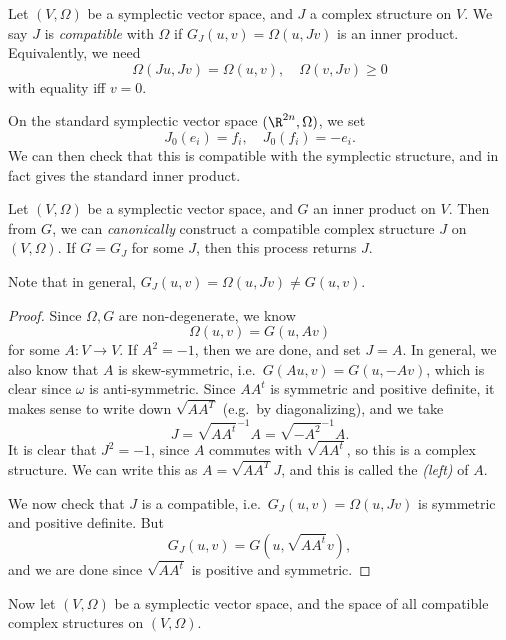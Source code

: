 \documentclass[a4paper]{article}
\begin{document}
\begin{defi}
  Let $(V, \Omega)$ be a symplectic vector space, and $J$ a complex structure on $V$. We say $J$ is \emph{compatible} with $\Omega$ if $G_J(u, v) = \Omega(u, Jv)$ is an inner product. Equivalently, we need
  \[
    \Omega(Ju, Jv) = \Omega(u, v),\quad \Omega(v, Jv) \geq 0
  \]
  with equality iff $v = 0$.
\end{defi}

\begin{eg}
  On the standard symplectic vector space $(\R^{2n}, \Omega)$, we set
  \[
    J_0(e_i) = f_i,\quad J_0(f_i) = - e_i.
  \]
  We can then check that this is compatible with the symplectic structure, and in fact gives the standard inner product.
\end{eg}

\begin{prop}
  Let $(V, \Omega)$ be a symplectic vector space, and $G$ an inner product on $V$. Then from $G$, we can \emph{canonically} construct a compatible complex structure $J$ on $(V, \Omega)$. If $G = G_{J}$ for some $J$, then this process returns $J$.
\end{prop}

Note that in general, $G_J(u, v) = \Omega(u, Jv) \not= G(u, v)$.
\begin{proof}
  Since $\Omega, G$ are non-degenerate, we know
  \[
    \Omega(u, v) = G(u, Av)
  \]
  for some $A: V \to V$. If $A^2 = -1$, then we are done, and set $J = A$. In general, we also know that $A$ is skew-symmetric, i.e.\ $G(Au, v) = G(u, -Av)$, which is clear since $\omega$ is anti-symmetric. Since $AA^t$ is symmetric and positive definite, it makes sense to write down $\sqrt{AA^T}$ (e.g.\ by diagonalizing), and we take
  \[
    J = \sqrt{AA^t}^{-1} A = \sqrt{-A^2}^{-1} A.
  \]
  It is clear that $J^2 = -1$, since $A$ commutes with $\sqrt{AA^t}$, so this is a complex structure. We can write this as $A = \sqrt{AA^T} J$, and this is called the \emph{(left)}  of $A$.

  We now check that $J$ is a compatible, i.e.\ $G_J(u, v) = \Omega(u, Jv)$ is symmetric and positive definite. But
  \[
    G_J(u, v) = G(u, \sqrt{AA^t}v),
  \]
  and we are done since $\sqrt{AA^t}$ is positive and symmetric.
\end{proof}

Now let $(V, \Omega)$ be a symplectic vector space, and  the space of all compatible complex structures on $(V, \Omega)$.
\end{document}
